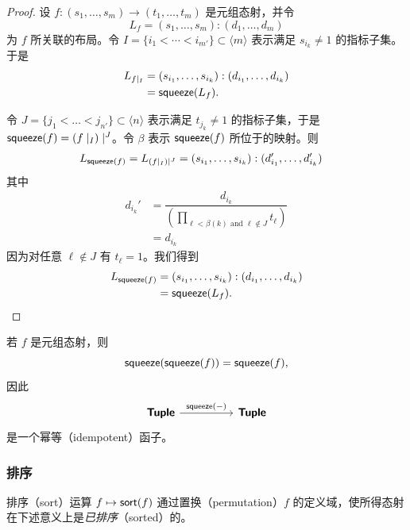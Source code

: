 \begin{proof}
    设 $f:(s_1,\dots,s_m) \to (t_1,\dots,t_m)$ 是元组态射，并令
    \[
    L_f = (s_1,\dots,s_m):(d_1,\dots,d_m)
    \]
    为 $f$ 所关联的布局。令 $I = \{i_1<\cdots < i_{m'}\} \subset \langle m \rangle$ 表示满足 $s_{i_k} \neq 1$ 的指标子集。于是
    \begin{align*}
    L_{f \mid_I} & = (s_{i_1},\dots,s_{i_k}):(d_{i_1},\dots,d_{i_k})\\
    & = \mathsf{squeeze}(L_f).
    \end{align*}
    
    \noindent 令 $J = \{j_1<\dots<j_{n'}\} \subset \langle n \rangle$ 表示满足 $t_{j_k} \neq 1$ 的指标子集，于是 $\mathsf{squeeze}(f) = \left(f \mid_I \right)\mid^J$。令 $\beta$ 表示 $\mathsf{squeeze}(f)$ 所位于的映射。则
    \begin{align*}
        L_{\mathsf{squeeze}(f)} = L_{\left( f \mid_I \right)\mid^J} & = (s_{i_1},\dots,s_{i_k}) : (d_{i_1}',\dots,d_{i_k}')
    \end{align*}
    其中
    \begin{align*}
    d_{i_k}' & = \dfrac{d_{i_k}}{\left( \displaystyle\prod_{\ell < \beta(k) \text{ and }\ell \notin J } t_{\ell} \right)}\\
    & = d_{i_k}
    \end{align*}
    因为对任意 $\ell \notin J$ 有 $t_\ell = 1$。我们得到
    \begin{align*}
    L_{\mathsf{squeeze}(f)} & = (s_{i_1},\dots,s_{i_k}):(d_{i_1},\dots,d_{i_k})\\
    & = \mathsf{squeeze}(L_f).
    \end{align*}
\end{proof}

\begin{observation}
    若 $f$ 是元组态射，则
    \[
    \mathsf{squeeze}(\mathsf{squeeze}(f)) = \mathsf{squeeze}(f),
    \]
    因此
    \[
    \begin{tikzcd} 
    \catstyle{Tuple} \ar[rr,"\squeeze(-)"] & & \catstyle{Tuple}
    \end{tikzcd} \]
    是一个幂等（idempotent）函子。
\end{observation}



\subsubsection{排序}
\label{subsubsection.sort}

排序（sort）运算 $f \mapsto \mathsf{sort}(f)$ 通过置换（permutation）$f$ 的定义域，使所得态射在下述意义上是{\it 已排序}（sorted）的。

